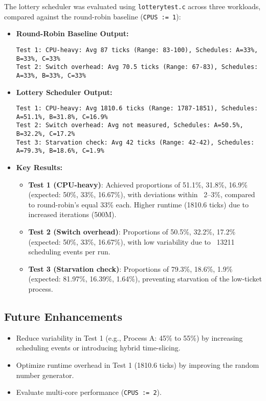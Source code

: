 \documentclass[12pt]{article}
\begin{document}
The lottery scheduler was evaluated using \texttt{lotterytest.c} across three workloads, compared against the round-robin baseline (\texttt{CPUS := 1}):

\begin{itemize}
    \item \textbf{Round-Robin Baseline Output:}
    \begin{lstlisting}
Test 1: CPU-heavy: Avg 87 ticks (Range: 83-100), Schedules: A=33%, B=33%, C=33%
Test 2: Switch overhead: Avg 70.5 ticks (Range: 67-83), Schedules: A=33%, B=33%, C=33%
    \end{lstlisting}

    \item \textbf{Lottery Scheduler Output:}
    \begin{lstlisting}
Test 1: CPU-heavy: Avg 1810.6 ticks (Range: 1787-1851), Schedules: A=51.1%, B=31.8%, C=16.9%
Test 2: Switch overhead: Avg not measured, Schedules: A=50.5%, B=32.2%, C=17.2%
Test 3: Starvation check: Avg 42 ticks (Range: 42-42), Schedules: A=79.3%, B=18.6%, C=1.9%
    \end{lstlisting}

    \item \textbf{Key Results:}
    \begin{itemize}
        \item \textbf{Test 1 (CPU-heavy)}: Achieved proportions of 51.1\%, 31.8\%, 16.9\% (expected: 50\%, 33\%, 16.67\%), with deviations within ~2–3\%, compared to round-robin’s equal 33\% each. Higher runtime (1810.6 ticks) due to increased iterations (500M).
        \item \textbf{Test 2 (Switch overhead)}: Proportions of 50.5\%, 32.2\%, 17.2\% (expected: 50\%, 33\%, 16.67\%), with low variability due to ~13211 scheduling events per run.
        \item \textbf{Test 3 (Starvation check)}: Proportions of 79.3\%, 18.6\%, 1.9\% (expected: 81.97\%, 16.39\%, 1.64\%), preventing starvation of the low-ticket process.
    \end{itemize}
\end{itemize}

\subsection{Future Enhancements}
\label{subsec:lottery-future}

\begin{itemize}
    \item Reduce variability in Test 1 (e.g., Process A: 45\% to 55\%) by increasing scheduling events or introducing hybrid time-slicing.
    \item Optimize runtime overhead in Test 1 (1810.6 ticks) by improving the random number generator.
    \item Evaluate multi-core performance (\texttt{CPUS := 2}).
\end{itemize}
\end{document}
